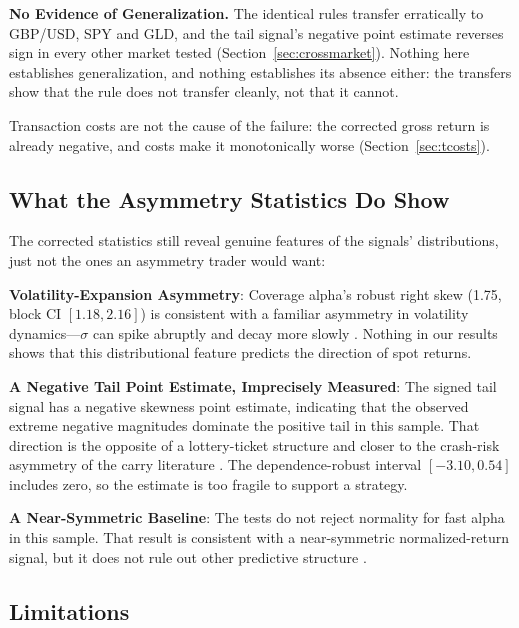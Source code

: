\documentclass[11pt]{article}
\begin{document}
\textbf{No Evidence of Generalization.} The identical rules transfer erratically to GBP/USD, SPY and GLD, and the tail signal's negative point estimate reverses sign in every other market tested (Section~\ref{sec:crossmarket}). Nothing here establishes generalization, and nothing establishes its absence either: the transfers show that the rule does not transfer cleanly, not that it cannot.

Transaction costs are not the cause of the failure: the corrected gross return is already negative, and costs make it monotonically worse (Section~\ref{sec:tcosts}).

\subsection{What the Asymmetry Statistics Do Show}

The corrected statistics still reveal genuine features of the signals' distributions, just not the ones an asymmetry trader would want:

\textbf{Volatility-Expansion Asymmetry}: Coverage alpha's robust right skew (1.75, block CI $[1.18, 2.16]$) is consistent with a familiar asymmetry in volatility dynamics---$\sigma$ can spike abruptly and decay more slowly \citep{bollerslev1986generalized, engle1982autoregressive}. Nothing in our results shows that this distributional feature predicts the direction of spot returns.

\textbf{A Negative Tail Point Estimate, Imprecisely Measured}: The signed tail signal has a negative skewness point estimate, indicating that the observed extreme negative magnitudes dominate the positive tail in this sample. That direction is the opposite of a lottery-ticket structure \citep{kumar2009gambles, bali2011maxing} and closer to the crash-risk asymmetry of the carry literature \citep{brunnermeier2009carry, burnside2011carry}. The dependence-robust interval $[-3.10, 0.54]$ includes zero, so the estimate is too fragile to support a strategy.

\textbf{A Near-Symmetric Baseline}: The tests do not reject normality for fast alpha in this sample. That result is consistent with a near-symmetric normalized-return signal, but it does not rule out other predictive structure \citep{moskowitz2012time}.

\subsection{Limitations}
\label{sec:limitations}
\end{document}

